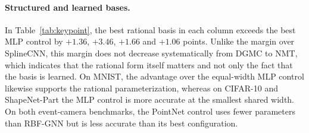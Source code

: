 \documentclass{article} %
\newcommand{\code}[1]{\texttt{#1}}
\begin{document}
\paragraph{Structured and learned bases.} In Table~\ref{tab:keypoint}, the best
rational basis in each column exceeds the best MLP control by $+1.36$,
$+3.46$, $+1.66$ and $+1.06$ points. Unlike the margin over SplineCNN, this
margin does not decrease systematically from DGMC to NMT, which indicates that
the rational form itself matters and not only the fact that the basis is
learned. On MNIST, the advantage over the equal-width MLP control likewise
supports the rational parameterization, whereas on CIFAR-10 and ShapeNet-Part
the MLP control is more accurate at the smallest shared width. On both
event-camera benchmarks, the PointNet control uses fewer parameters than
RBF-GNN but is less accurate than its best configuration.

\FloatBarrier
\setcounter{topnumber}{2}
%
%
%
\end{document}
